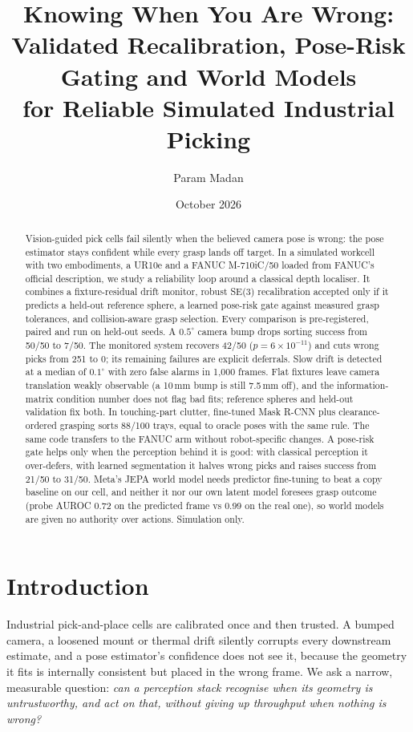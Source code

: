 \documentclass[10pt,twocolumn]{article}
\title{Knowing When You Are Wrong:\\ Validated Recalibration, Pose-Risk Gating and World Models\\ for Reliable Simulated Industrial Picking}
\author{Param Madan}
\date{October 2026}
\begin{document}
\maketitle

\begin{abstract}
Vision-guided pick cells fail silently when the believed camera pose is wrong: the pose estimator stays confident
while every grasp lands off target. In a simulated workcell with two embodiments, a UR10e and a FANUC M-710iC/50 loaded
from FANUC's official description, we study a reliability loop around a classical depth localiser. It combines a
fixture-residual drift monitor, robust SE(3) recalibration accepted only if it predicts a held-out reference sphere, a
learned pose-risk gate against measured grasp tolerances, and collision-aware grasp selection. Every comparison is
pre-registered, paired and run on held-out seeds. A $0.5^\circ$ camera bump drops sorting success from 50/50 to 7/50.
The monitored system recovers 42/50 ($p=6\times10^{-11}$) and cuts wrong picks from 251 to 0; its remaining failures are
explicit deferrals. Slow drift is detected at a median of $0.1^\circ$ with zero false alarms in 1{,}000 frames. Flat
fixtures leave camera translation weakly observable (a 10\,mm bump is still 7.5\,mm off), and the information-matrix
condition number does not flag bad fits; reference spheres and held-out validation fix both. In touching-part clutter,
fine-tuned Mask R-CNN plus clearance-ordered grasping sorts 88/100 trays, equal to oracle poses with the same rule.
The same code transfers to the FANUC arm without robot-specific changes. A pose-risk gate helps only when the
perception behind it is good: with classical perception it over-defers, with learned segmentation it halves wrong
picks and raises success from 21/50 to 31/50. Meta's JEPA world model needs predictor fine-tuning to beat a copy
baseline on our cell, and neither it nor our own latent model foresees grasp outcome (probe AUROC 0.72 on the
predicted frame vs 0.99 on the real one), so world models are given no authority over actions. Simulation only.
\end{abstract}

\section{Introduction}
Industrial pick-and-place cells are calibrated once and then trusted. A bumped camera, a loosened mount or thermal
drift silently corrupts every downstream estimate, and a pose estimator's confidence does not see it, because the
geometry it fits is internally consistent but placed in the wrong frame. We ask a narrow, measurable question: \emph{can
a perception stack recognise when its geometry is untrustworthy, and act on that, without giving up throughput when
nothing is wrong?}
\end{document}
